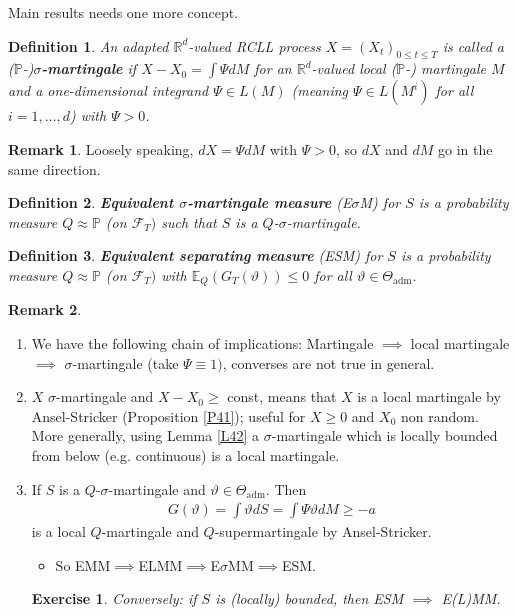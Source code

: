 \documentclass[12pt,a4paper, twoside]{article}
\newtheorem{defn}{Definition}[section]
\newtheorem{exe}{Exercise}[section]
\theoremstyle{definition}
\newtheorem{rem}{Remark}[section]
\newcommand{\EE}{\mathbb{E}} %
\newcommand{\PP}{\mathbb{P}} %
\begin{document}
Main results needs one more concept. 
\begin{defn} An adapted $\mathbb{R}^d$-valued RCLL process $X=(X_t)_{0 \leq t \leq T}$ is called a ($\PP$-)\textbf{$\sigma$-martingale} if $X-X_0 = \int \Psi dM$ for an $\mathbb{R}^d$-valued local ($\PP$-) martingale $M$ and a one-dimensional integrand $\Psi \in L(M)$ (meaning $\Psi \in L(M^i)$ for all $i=1, \dots , d$) with $\Psi >0$. 
\end{defn}
\begin{rem}Loosely speaking, $dX= \Psi dM$ with $\Psi >0$, so $dX$ and $dM$ go in the same direction. 
\end{rem}
\begin{defn} \textbf{Equivalent $\sigma$-martingale measure} (E$\sigma$M) for $S$ is a probability measure $Q \approx \PP$ (on $\mathcal{F}_T)$ such that $S$ is a $Q$-$\sigma$-martingale. 
\end{defn}
\begin{defn} \textbf{Equivalent separating measure} (ESM) for $S$ is a probability measure $Q \approx \PP$ (on $\mathcal{F}_T)$ with $\EE_Q(G_T( \vartheta)) \leq 0$ for all $\vartheta \in \Theta_\text{adm}$. 
\end{defn}
\begin{rem} \label{R55} \
\begin{enumerate}
\item We have the following chain of implications: Martingale $\implies$ local martingale $\implies$ $\sigma$-martingale (take $\Psi \equiv 1)$, converses are not true in general. 
\item $X$ $\sigma$-martingale and $X-X_0 \geq $ const, means that $X$ is a local martingale by Ansel-Stricker (Proposition \ref{P41}); useful for $X \geq 0$ and $X_0$ non random. More generally, using Lemma \ref{L42} a $\sigma$-martingale which is locally bounded from below (e.g. continuous) is a local martingale. 
\item If $S$ is a $Q$-$\sigma$-martingale and $\vartheta \in \Theta_\text{adm}$. Then
\begin{align*}
G( \vartheta) = \int \vartheta dS = \int \Psi \vartheta dM \geq - a
\end{align*}
is a local $Q$-martingale and $Q$-supermartingale by Ansel-Stricker. 
\begin{itemize}
\item So EMM$\implies$ELMM$\implies$E$\sigma$MM$\implies$ESM.
\end{itemize}
\begin{exe} \label{ex15} Conversely: if $S$ is (locally) bounded, then ESM $\implies$ E(L)MM. 
\end{exe}
\end{enumerate}
\end{rem}
\end{document}
